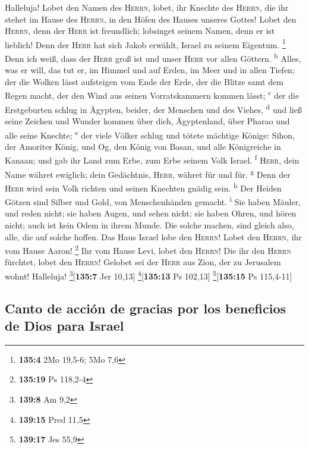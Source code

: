  Halleluja! Lobet den Namen des \textsc{Herrn}, lobet, ihr
Knechte des \textsc{Herrn},  die ihr stehet im Hause des
\textsc{Herrn}, in den Höfen des Hauses unseres Gottes! 
Lobet den \textsc{Herrn}, denn der \textsc{Herr} ist freundlich;
lobsinget seinem Namen, denn er ist lieblich!  Denn der
\textsc{Herr} hat sich Jakob erwählt, Israel zu seinem Eigentum.
\footnote{\textbf{135:4} 2Mo 19,5-6; 5Mo 7,6}  Denn ich
weiß, dass der \textsc{Herr} groß ist und unser \textsc{Herr} vor allen
Göttern. \textsuperscript{b}  Alles, was er will, das tut
er, im Himmel und auf Erden, im Meer und in allen Tiefen; 
der die Wolken lässt aufsteigen vom Ende der Erde, der die Blitze samt
dem Regen macht, der den Wind aus seinen Vorratskammern kommen lässt;
\textsuperscript{c}  der die Erstgeburten schlug in
Ägypten, beider, der Menschen und des Viehes, \textsuperscript{d}
 und ließ seine Zeichen und Wunder kommen über dich,
Ägyptenland, über Pharao und alle seine Knechte; \textsuperscript{e}
 der viele Völker schlug und tötete mächtige Könige:
 Sihon, der Amoriter König, und Og, den König von Basan,
und alle Königreiche in Kanaan;  und gab ihr Land zum
Erbe, zum Erbe seinem Volk Israel. \textsuperscript{f} 
\textsc{Herr}, dein Name währet ewiglich; dein Gedächtnis,
\textsc{Herr}, währet für und für. \textsuperscript{g} 
Denn der \textsc{Herr} wird sein Volk richten und seinen Knechten gnädig
sein. \textsuperscript{h}  Der Heiden Götzen sind Silber
und Gold, von Menschenhänden gemacht. \textsuperscript{i}
 Sie haben Mäuler, und reden nicht; sie haben Augen, und
sehen nicht;  sie haben Ohren, und hören nicht; auch ist
kein Odem in ihrem Munde.  Die solche machen, sind gleich
also, alle, die auf solche hoffen.  Das Haus Israel lobe
den \textsc{Herrn}! Lobet den \textsc{Herrn}, ihr vom Hause Aaron!
\footnote{\textbf{135:19} Ps 118,2-4}  Ihr vom Hause
Levi, lobet den \textsc{Herrn}! Die ihr den \textsc{Herrn} fürchtet,
lobet den \textsc{Herrn}!  Gelobet sei der \textsc{Herr}
aus Zion, der zu Jerusalem wohnt! Halleluja!
\footnote{\textbf{139:8} Am 9,2}{[}\textbf{135:7} Jer 10,13{]}
\footnote{\textbf{139:15} Pred 11,5}{[}\textbf{135:13} Ps 102,13{]}
\footnote{\textbf{139:17} Jes 55,9}{[}\textbf{135:15} Ps 115,4-11{]}

\hypertarget{canto-de-acciuxf3n-de-gracias-por-los-beneficios-de-dios-para-israel}{%
\subsection{Canto de acción de gracias por los beneficios de Dios para
Israel}\label{canto-de-acciuxf3n-de-gracias-por-los-beneficios-de-dios-para-israel}}

